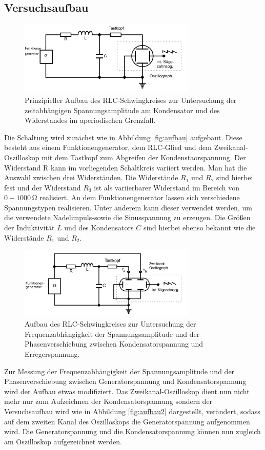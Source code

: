 \subsection{Versuchsaufbau}
\label{sec:Versuchsaufbau}
\begin{figure}
  \centering
  \includegraphics[width=0.75\textwidth]{Bilder/aufbaau.png}
  \caption{Prinzipieller Aufbau des RLC-Schwingkreises zur Untersuchung der zeitabhängigen Spannungsamplitude am Kondensator und des Widerstandes im aperiodischen Grenzfall.}
  \label{fig:aufbau}
\end{figure}
Die Schaltung wird zunächst wie in Abbildung \eqref{fig:aufbau} aufgebaut. Diese besteht aus einem Funktionengenerator, dem RLC-Glied und dem Zweikanal-Oszilloskop mit dem Tastkopf zum Abgreifen der Kondenstaorspannung.
Der Widerstand R kann im vorliegenden Schaltkreis variiert werden. Man hat die Auswahl zwischen drei Widerständen. Die Widerstände $R_\text{1}$ und $R_\text{2}$ sind hierbei fest und der Widerstand $R_\text{3}$ ist als variierbarer Widerstand im Bereich von $0-1000\,\si{\ohm}$ realisiert.
An dem Funktionengenerator lassen sich verschiedene Spannungstypen realisieren. Unter anderem kann dieser verwendet werden, um die verwendete Nadelimpuls-sowie die Sinusspannung zu erzeugen.
Die Größen der Induktivität $L$ und des Kondensators $C$ sind hierbei ebenso bekannt wie die Widerstände $R_\text{1}$ und $R_\text{2}$.
\begin{figure}
  \centering
  \includegraphics[width=0.75\textwidth]{Bilder/aufbauu.png}
  \caption{Aufbau des RLC-Schwingkreises zur Untersuchung der Frequenzabhängigkeit der Spannungsamplitude und der Phasenverschiebung zwischen Kondensatorspannung und Erregerspannung.}
  \label{fig:aufbau2}
\end{figure}
Zur Messung der Frequenzabhängigkeit der Spannungsamplitude und der Phasenverschiebung zwischen Generatorspannung und Kondensatorspannung wird der Aufbau etwas modifiziert.
Das Zweikanal-Oszilloskop dient nun nicht mehr nur zum Aufzeichnen der Kondensatorspannung sondern der Versuchsaufbau wird wie in Abbildung \eqref{fig:aufbau2} dargestellt, verändert, sodass auf dem zweiten Kanal des Oszilloskops die Generatorspannung aufgenommen wird. Die Generatorspannung und die Kondensatorspannung können nun zugleich am Oszilloskop aufgezeichnet werden.

